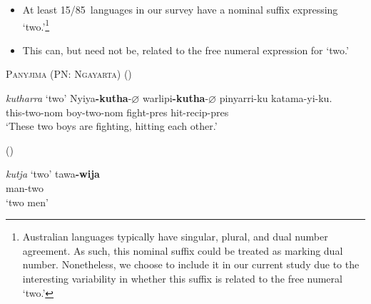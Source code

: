 \documentclass{article}
\makeatletter
\newcommand{\ofy}{/85} %
\makeatother
\begin{document}
\begin{itemize}
    \item At least 15\ofy\ languages in our survey have a nominal suffix expressing `two.'\footnote{Australian languages typically have singular, plural, and dual number agreement. As such, this nominal suffix could be treated as marking dual number. Nonetheless, we choose to include it in our current study due to the interesting variability in whether this suffix is related to the free numeral `two.'}
    \item This can, but need not be, related to the free numeral expression for `two.' %
\end{itemize}

\begin{exe}
\ex \textsc{Panyjima (PN: Ngayarta)} (\citealt[121]{dench81})
\begin{xlist}
\ex \textit{kutharra} `two'
\ex \gll Nyiya\textbf{-kutha}-$\varnothing$ warlipi\textbf{-kutha}-$\varnothing$ pinyarri-ku katama-yi-ku.\\
this-two-{\sc nom} boy-two-{\sc nom} fight-{\sc pres} hit-{\sc recip}-{\sc pres}\\
\glt `These two boys are fighting, hitting each other.'
\end{xlist}
 (\citealt[140]{breen71}) 
\begin{xlist}
\ex \textit{kutja} `two'
\ex \gll tawa\textbf{-wija}\\
    man-two\\
 \glt   `two men'
\end{xlist}
\end{exe}
\end{document}
